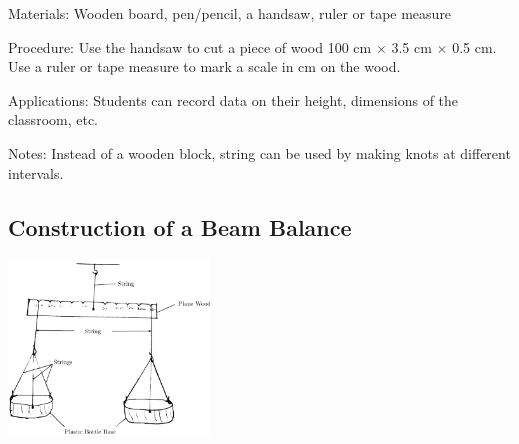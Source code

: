 \begin{multicols}{2}
\begin{description*}
\item[Materials:]{Wooden board, pen\slash pencil, a handsaw, ruler or tape measure}
\item[Procedure:]{Use the handsaw to cut a piece of wood 100 cm $\times$ 3.5 cm $\times$ 0.5 cm. Use a ruler or tape measure to mark a scale in cm on the wood.}
\item[Applications:]{Students can record data on their height, dimensions of the classroom, etc.}
\item[Notes:]{Instead of a wooden block, string can be used by making knots at different intervals.}
\end{description*}

\subsection{Construction of a Beam Balance}
\label{sub:beambalance}

\begin{center}
\includegraphics[width=0.4\textwidth]{./img/beam-balance.png}
\end{center}


\end{multicols}
